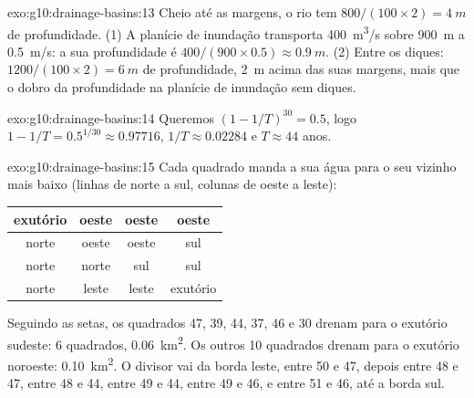 \begin{solution}{exo:g10:drainage-basins:13}
Cheio até as margens, o rio tem $800/(100 \times 2) = \qty{4}{m}$ de
profundidade. (1) A planície de inundação transporta \qty{400}{m^3/s} sobre
\qty{900}{m} a \qty{0.5}{m/s}: a sua profundidade é
$400/(900 \times 0.5) \approx \qty{0.9}{m}$. (2) Entre os diques:
$1200/(100 \times 2) = \qty{6}{m}$ de profundidade, \qty{2}{m} acima das suas margens, mais que o
dobro da profundidade na planície de inundação sem diques.
\end{solution}

\begin{solution}{exo:g10:drainage-basins:14}
Queremos $(1 - 1/T)^{30} = 0.5$, logo $1 - 1/T = 0.5^{1/30} \approx 0.97716$,
$1/T \approx 0.02284$ e $T \approx 44$ anos.
\end{solution}

\begin{solution}{exo:g10:drainage-basins:15}
Cada quadrado manda a sua água para o seu vizinho mais baixo (linhas de
norte a sul, colunas de oeste a leste):
\begin{center}
\begin{tabular}{|c|c|c|c|}
\hline
exutório & oeste & oeste & oeste \\ \hline
norte & oeste & oeste & sul \\ \hline
norte & norte & sul & sul \\ \hline
norte & leste & leste & exutório \\ \hline
\end{tabular}
\end{center}
Seguindo as setas, os quadrados 47, 39, 44, 37, 46 e 30 drenam para o
exutório sudeste: 6 quadrados, \qty{0.06}{km^2}. Os outros 10 quadrados
drenam para o exutório noroeste: \qty{0.10}{km^2}. O divisor vai da borda
leste, entre 50 e 47, depois entre 48 e 47, entre 48 e 44, entre 49 e 44,
entre 49 e 46, e entre 51 e 46, até a borda sul.
\end{solution}

